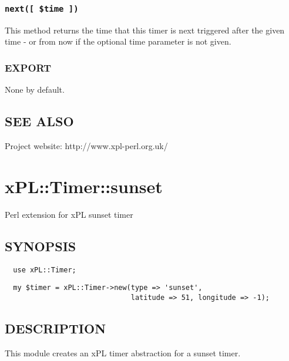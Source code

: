 \documentclass[12pt,a4paper]{article}
\begin{document}
\subsubsection*{\texttt{next([ \$time ])}\label{xPL::Timer::sunrise_next_time_}}


This method returns the time that this timer is next triggered after
the given time - or from now if the optional time parameter is not
given.

\subsubsection*{EXPORT\label{xPL::Timer::sunrise_EXPORT}}


None by default.

\subsection*{SEE ALSO\label{xPL::Timer::sunrise_SEE_ALSO}}


Project website: http://www.xpl-perl.org.uk/

\newpage
\section{xPL::Timer::sunset\label{xPL::Timer::sunset}}


Perl extension for xPL sunset timer

\subsection*{SYNOPSIS\label{xPL::Timer::sunset_SYNOPSIS}}
\begin{verbatim}
  use xPL::Timer;
\end{verbatim}
\begin{verbatim}
  my $timer = xPL::Timer->new(type => 'sunset',
                              latitude => 51, longitude => -1);
\end{verbatim}
\subsection*{DESCRIPTION\label{xPL::Timer::sunset_DESCRIPTION}}


This module creates an xPL timer abstraction for a sunset timer.
\end{document}
